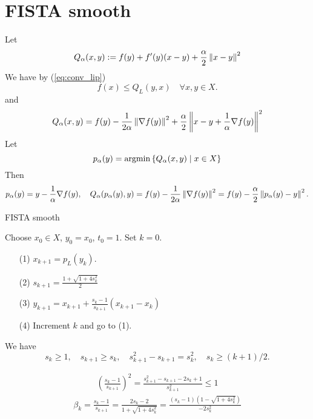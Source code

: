 \documentclass[12pt,english]{article}
\begin{document}
\section{FISTA smooth \cite{BeckTeboulle09}}\label{sec:}
%
Let
%
\begin{align*}
Q_{\alpha}(x,y) := f(y) + f'(y)(x-y) + \frac{\alpha}{2}\left\|x-y\right\|^2
\end{align*}
%
We have by (\ref{eq:conv_lip})
%
\begin{equation}\label{eq:QLoverestimate}
f(x) \le Q_L(y,x)\quad \forall x,y\in X.
\end{equation}
%
and
%
\begin{equation}\label{eq:}
Q_{\alpha}(x,y) = f(y) - \frac{1}{2\alpha}\left\|\nabla f(y)\right\|^2 + \frac{\alpha}{2}\left\|x-y+\frac{1}{\alpha} \nabla f(y)\right\|^2
\end{equation}
%
Let
%
\begin{equation}\label{eq:}
p_{\alpha}(y) = \operatorname*{argmin}\left\{Q_{\alpha}(x,y)\;\middle|\;x\in X\right\}
\end{equation}
%
Then
%
\begin{equation}\label{eq:Qmin}
p_{\alpha}(y) = y - \frac{1}{\alpha} \nabla f(y),\quad Q_{\alpha}(p_{\alpha}(y),y) = f(y) - \frac{1}{2\alpha}\left\|\nabla f(y)\right\|^2 = f(y)-\frac{\alpha}{2}\left\|p_{\alpha}(y)-y\right\|^2.
\end{equation}
%
%
\begin{yellow}
\begin{algorithm}[H]
\caption{FISTA smooth} 
\label{algorithm:FISTAsmooth} 
%
Choose $x_0\in X$, $y_0=x_0$, $t_0=1$. Set $k=0$.
%
\begin{itemize}
\item[(1)] $x_{k+1} = p_L(y_k)$.
\item[(2)] $s_{k+1} = \frac{1+\sqrt{1+4s_{k}^2}}{2}$
\item[(3)] $y_{k+1} = x_{k+1} + \frac{s_{k}-1}{s_{k+1}}(x_{k+1}-x_{k})$
\item[(4)] Increment $k$ and go to (1).
\end{itemize}
%
\end{algorithm}
\end{yellow}
%
We have
%
\begin{equation}\label{eq:FITAtk}
s_{k}\ge 1,\quad s_{k+1}\ge s_{k}, \quad s_{k+1}^2 - s_{k+1} = s_{k}^2, \quad s_{k} \ge (k+1)/2.
\end{equation}

%
\begin{align*}
\left(\frac{s_{k}-1}{s_{k+1}}\right)^2 = \frac{s_{k+1}^2-s_{k+1}-2s_{k}+1}{s_{k+1}^2}\le1
\end{align*}
%
%
\begin{align*}
\beta_k = \frac{s_{k}-1}{s_{k+1}} = \frac{2s_{k}-2}{1+\sqrt{1+4s_{k}^2}}
= \frac{(s_{k}-1)(1-\sqrt{1+4s_{k}^2})}{-2s_{k}^2}
\end{align*}
%
\end{document}

